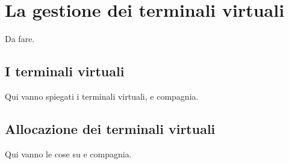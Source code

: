 \section{La gestione dei terminali virtuali}
\label{sec:sess_virtual_terminal}

% 
%

Da fare.

\subsection{I terminali virtuali}
\label{sec:sess_pty}

Qui vanno spiegati i terminali virtuali,  e compagnia.


\subsection{Allocazione dei terminali virtuali}
\label{sec:sess_openpty}

Qui vanno le cose su  e compagnia.




